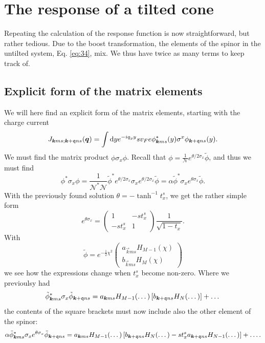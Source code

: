 \section{The response of a tilted cone}

Repeating the calculation of the response function is now straightforward, but rather tedious.
Due to the boost transformation, the elements of the spinor in the untilted system, Eq. \eqref{eq:34}, mix.
We thus have twice as many terms to keep track of.
\subsection{Explicit form of the matrix elements}
We will here find an explicit form of the matrix elements, starting with the charge current
\[
  J_{\bm{k} m s; \bm{k}+\mathfrak{q} n s } (\bm{q}) = \int \mathrm{d}y e^{-i q_{y} y}
  s v_{F} e \phi ^{*}_{\bm{k} m s} (y) \sigma ^{x} \phi _{\bm{k} + \mathfrak{q} n s}(y).
\]
We must find the matrix product \(\phi \sigma_{x} \phi \).
Recall that \(\phi = \frac{1}{\mathcal{N}} e^{\theta /2 \sigma _{x}} \tilde{\phi} \), and thus we must find
\[
  \phi ^{*} \sigma _{x} \phi
  = \frac{1}{\mathcal{N}^{*} \mathcal{N}} \tilde{\phi}^{*} e^{\theta /2 \sigma _{x}} \sigma _{x} e^{\theta /2 \sigma _{x}} \tilde{\phi}
  =  \alpha \tilde{\phi}^{*} \sigma _{x} e^{\theta \sigma _{x}} \tilde{\phi}.
\]
With the previously found solution \(\theta = - \tanh ^{-1} t^s_{x}\), we get the rather simple form
\[
  e^{\theta \sigma _{x}} =
  \begin{pmatrix}
    1 & - s t^s_{x}\\
    -s t^s_{x} & 1
  \end{pmatrix}
  \frac{1}{\sqrt{1-t_{x}}}.
\]
With
\begin{equation}\label{eq:76}
  \tilde{\phi} = e^{-\frac{1}{2} \chi ^2}
  \begin{pmatrix}
    a_{\vec{k} m s} H_{M-1} (\chi)\\
    b_{\vec{k} m s} H_{M} (\chi)
  \end{pmatrix}
\end{equation}
we see how the expressions change when \(t^s_{x}\) become non-zero.
Where we previoulsy had
\begin{equation}
  \label{eq:77}
  \tilde{\phi}  ^{*}_{\bm{k} m s} \sigma _{x} \tilde{\phi}  _{\bm{k} + \mathfrak{q} n s}
  =
  a_{\bm{k} m s} H_{M-1}(\dots) \left[ b_{\bm{k}+\mathfrak{q} n s} H_{N}(\dots) \right]
  + \dots
\end{equation}
the contents of the square brackets must now include also the other element of the spinor:
\begin{equation}
  \label{eq:78}
  \alpha \tilde{\phi}  ^{*}_{\bm{k} m s} \sigma _{x} e^{\theta \sigma _{x}} \tilde{\phi}  _{\bm{k} + \mathfrak{q} n s}
  =
  a_{\bm{k} m s} H_{M-1}(\dots)
  \left[
    b_{\bm{k}+\mathfrak{q} n s} H_{N}(\dots)
    - s t^s_{x} a_{\bm{k} + \mathfrak{q} n s} H_{N-1} (\dots)
  \right]
  + \dots .
\end{equation}


